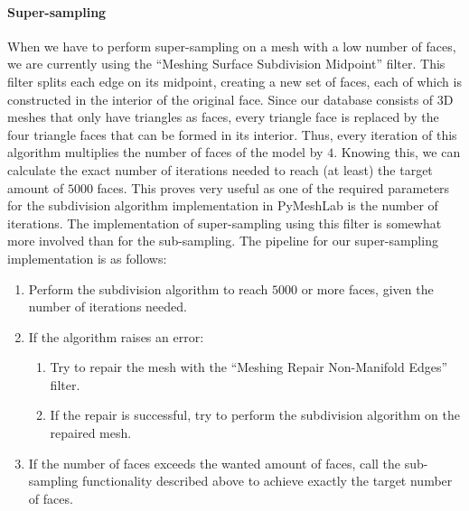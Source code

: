 \paragraph{Super-sampling}
When we have to perform super-sampling on a mesh with a low number of faces, we are currently using the ``Meshing
Surface Subdivision Midpoint'' filter.
This filter splits each edge on its midpoint, creating a new set of faces, each of which is constructed in the
interior of the original face.
Since our database consists of 3D meshes that only have triangles as faces, every triangle face is replaced by the four triangle faces that can be formed in its interior.
Thus, every iteration of this algorithm multiplies the number of faces of the model by $4$.
Knowing this, we can calculate the exact number of iterations needed to reach (at least) the target amount of $5000$
faces.
This proves very useful as one of the required parameters for the subdivision algorithm implementation in PyMeshLab is
the number of iterations.
The implementation of super-sampling using this filter is somewhat more involved than for the sub-sampling.
The pipeline for our super-sampling implementation is as follows:
\renewcommand{\labelenumii}{\theenumii}
\renewcommand{\theenumii}{\theenumi.\arabic{enumii}.}
\begin{enumerate}
    \item Perform the subdivision algorithm to reach $5000$ or more faces, given the number of iterations needed.
    \item If the algorithm raises an error:
    \begin{enumerate}
        \item Try to repair the mesh with the ``Meshing Repair Non-Manifold Edges'' filter.
        \item If the repair is successful, try to perform the subdivision algorithm on the repaired mesh.
    \end{enumerate} 
    \item If the number of faces exceeds the wanted amount of faces, call the sub-sampling functionality described
    above to achieve exactly the target number of faces.
\end{enumerate}


